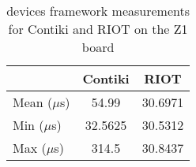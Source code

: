 \begin{table}[!ht]
  \centering
  \begin{tabular}{l|c|c}
                & Contiki  & RIOT \\ \hline
  Mean ($\mu$s) & 54.99    & 30.6971 \\
  Min  ($\mu$s) & 32.5625  & 30.5312 \\
  Max  ($\mu$s) & 314.5    & 30.8437
  \end{tabular}
  \caption{devices framework measurements for Contiki and RIOT on the Z1 board}
  \label{tab:devices-framework-z1}
  \end{table}